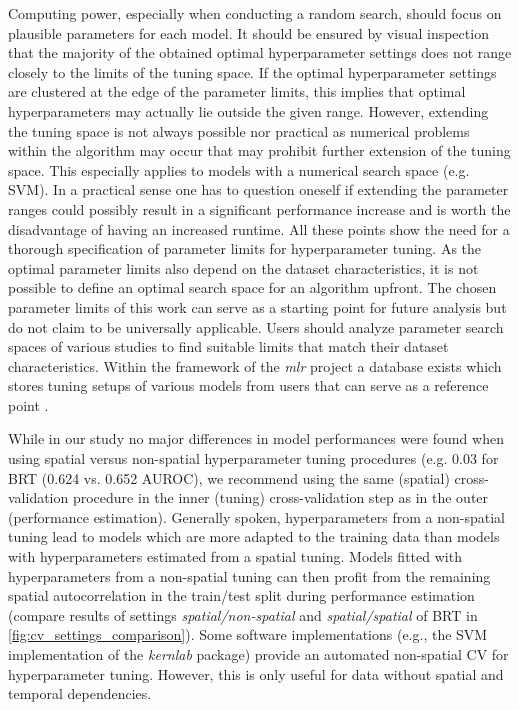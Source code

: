 \documentclass[review]{elsarticle}
\begin{document}
Computing power, especially when conducting a random search, should focus on plausible parameters for each model.
It should be ensured by visual inspection that the majority of the obtained optimal hyperparameter settings does not range closely to the limits of the tuning space.
If the optimal hyperparameter settings are clustered at the edge of the parameter limits, this implies that optimal hyperparameters may actually lie outside the given range.
However, extending the tuning space is not always possible nor practical as numerical problems within the algorithm may occur that may prohibit further extension of the tuning space.
This especially applies to models with a numerical search space (e.g. \ac{SVM}).
In a practical sense one has to question oneself if extending the parameter ranges could possibly result in a significant performance increase and is worth the disadvantage of having an increased runtime.
All these points show the need for a thorough specification of parameter limits for hyperparameter tuning.
As the optimal parameter limits also depend on the dataset characteristics, it is not possible to define an optimal search space for an algorithm upfront.
The chosen parameter limits of this work can serve as a starting point for future analysis but do not claim to be universally applicable.
Users should analyze parameter search spaces of various studies to find suitable limits that match their dataset characteristics.
Within the framework of the \textit{mlr} project a database exists which stores tuning setups of various models from users that can serve as a reference point \citep{mlrhyperopt}.

While in our study no major differences in model performances were found when using spatial versus non-spatial hyperparameter tuning procedures (e.g. 0.03 for \ac{BRT} (0.624 vs. 0.652 AUROC), we recommend using the same (spatial) cross-validation procedure in the inner (tuning) cross-validation step as in the outer (performance estimation).
Generally spoken, hyperparameters from a non-spatial tuning lead to models which are more adapted to the training data than models with hyperparameters estimated from a spatial tuning.
Models fitted with hyperparameters from a non-spatial tuning can then profit from the remaining spatial autocorrelation in the train/test split during performance estimation (compare results of settings \textit{spatial/non-spatial} and \textit{spatial/spatial} of BRT in \autoref{fig:cv_settings_comparison}).
Some software implementations (e.g., the SVM implementation of the \textit{kernlab} package) provide an automated non-spatial CV for hyperparameter tuning.
However, this is only useful for data without spatial and temporal dependencies.
\end{document}
